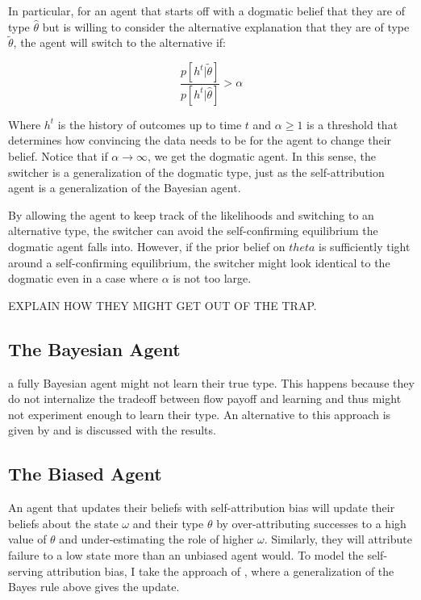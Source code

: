 \documentclass[
  12pt,
]{article}
\begin{document}
In particular, for an agent that starts off with a dogmatic belief that
they are of type \(\hat{\theta}\) but is willing to consider the
alternative explanation that they are of type \(\tilde{\theta}\), the
agent will switch to the alternative if:

\[\frac{p[h^t|\tilde{\theta}]}{p[h^t|\hat{\theta}]} > \alpha\]

Where \(h^t\) is the history of outcomes up to time \(t\) and
\(\alpha \geq 1\) is a threshold that determines how convincing the data
needs to be for the agent to change their belief. Notice that if
\(\alpha \to \infty\), we get the dogmatic agent. In this sense, the
switcher is a generalization of the dogmatic type, just as the
self-attribution agent is a generalization of the Bayesian agent.

By allowing the agent to keep track of the likelihoods and switching to
an alternative type, the switcher can avoid the self-confirming
equilibrium the dogmatic agent falls into. However, if the prior belief
on \(theta\) is sufficiently tight around a self-confirming equilibrium,
the switcher might look identical to the dogmatic even in a case where
\(\alpha\) is not too large.

EXPLAIN HOW THEY MIGHT GET OUT OF THE TRAP.

\hypertarget{the-bayesian-agent}{%
\subsection{The Bayesian Agent}\label{the-bayesian-agent}}

a fully Bayesian agent might not learn their true type. This happens
because they do not internalize the tradeoff between flow payoff and
learning and thus might not experiment enough to learn their type. An
alternative to this approach is given by \citet{Hestermann2021} and is
discussed with the results.

\hypertarget{the-biased-agent}{%
\subsection{The Biased Agent}\label{the-biased-agent}}

An agent that updates their beliefs with self-attribution bias will
update their beliefs about the state \(\omega\) and their type
\(\theta\) by over-attributing successes to a high value of \(\theta\)
and under-estimating the role of higher \(\omega\). Similarly, they will
attribute failure to a low state more than an unbiased agent would. To
model the self-serving attribution bias, I take the approach of
\citet{benjamin2019}, where a generalization of the Bayes rule above
gives the update.
\end{document}
